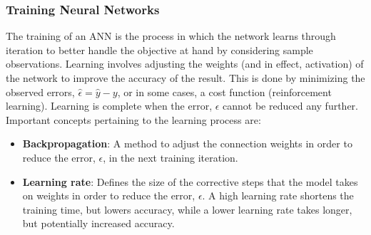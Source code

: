 \documentclass[xcolor=dvipsnames, english, 8pt]{beamer}
\begin{document}
\begin{frame}
    \frametitle{Training Neural Networks}
    The training of an ANN is the process in which the network {\color{ubRed}learns through iteration} to better handle the objective at hand by considering sample observations. Learning involves {\color{ubRed}adjusting the weights} (and in effect, activation) of the network to {\color{ubRed}improve the accuracy of the result}. This is done by minimizing the observed errors, $\hat{\epsilon} = \hat{y}-y$, or in some cases, a cost function (reinforcement learning). Learning is complete when the error, $\epsilon$ cannot be reduced any further. Important concepts pertaining to the learning process are: \vspace{0.25cm}\\
    \begin{itemize}
        \item \textbf{\color{ubRed}Backpropagation}:  A method to adjust the connection weights in order to reduce the error, $\epsilon$, in the next training iteration.
        \item \textbf{\color{ubRed}Learning rate}:  Defines the size of the corrective steps that the model takes on weights in order to reduce the error, $\epsilon$. A high learning rate shortens the training time, but lowers accuracy, while a lower learning rate takes longer, but potentially increased accuracy.
    \end{itemize}
\end{frame}
\end{document}
